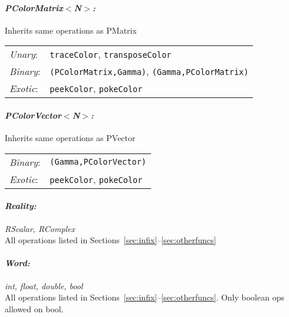 \documentclass[12pt,letterpaper]{article}
\begin{document}
\paragraph{\bf\em PColorMatrix$<$N$>$:}
  Inherits same operations as PMatrix
\begin{flushleft}
  \begin{tabular}{lp{5.0in}}
  {\em Unary}:& {\tt traceColor}, {\tt transposeColor}\\
  {\em Binary}:& {\tt *(PColorMatrix,Gamma)}, {\tt *(Gamma,PColorMatrix)}\\
  {\em Exotic}:& {\tt peekColor}, {\tt pokeColor}\\
  \end{tabular}
\end{flushleft}

\paragraph{\bf\em PColorVector$<$N$>$:}
  Inherits same operations as PVector
\begin{flushleft}
  \begin{tabular}{lp{5.0in}}
  {\em Binary}:& {\tt *(Gamma,PColorVector)}\\
  {\em Exotic}:& {\tt peekColor}, {\tt pokeColor}\\
  \end{tabular}
\end{flushleft}


\paragraph{\bf\em Reality:} {\em RScalar, RComplex}\\
All operations listed in Sections~\ref{sec:infix}--\ref{sec:otherfuncs}

\paragraph{\bf\em Word:} {\em int, float, double, bool}\\
All operations listed in Sections~\ref{sec:infix}--\ref{sec:otherfuncs}.
Only boolean ops allowed on bool.

\newpage

\end{document}
